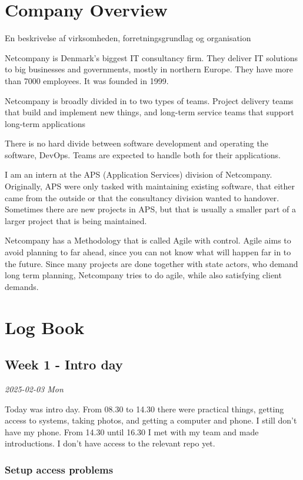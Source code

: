 \documentclass[../main.tex]{subfiles}
\begin{document}
\section{Company Overview}
En beskrivelse af virksomheden, forretningsgrundlag og organisation 

Netcompany is Denmark's biggest IT consultancy firm.
They deliver IT solutions to big businesses and governments, mostly in northern Europe.
They have more than 7000 employees. It was founded in 1999. 

Netcompany is broadly divided in to two types of teams.
Project delivery teams that build and implement new things, and long-term service teams that support long-term applications

There is no hard divide between software development and operating the software, DevOps. Teams are expected to handle both for their applications. 

I am an intern at the APS (Application Services) division of Netcompany.
Originally, APS were only tasked with maintaining existing software, that either came from the outside or that the consultancy division wanted to handover.
Sometimes there are new projects in APS, but that is usually a smaller part of a larger project that is being maintained.  

Netcompany has a Methodology that is called Agile with control. Agile aims to avoid planning to far ahead, since you can not know what will happen far in to the future.
Since many projects are done together with state actors, who demand long term planning, Netcompany tries to do agile, while also satisfying client demands. 
\section{Log Book}
\subsection{Week 1 - Intro day}

\textit{2025-02-03 Mon}

Today was intro day. From 08.30 to 14.30 there were practical things, getting access to systems, taking photos, and getting a computer and phone. I still don't have my phone. From 14.30 until 16.30 I met with my team and made introductions. I don't have access to the relevant repo yet.

\subsubsection{Setup access problems}
\end{document}
